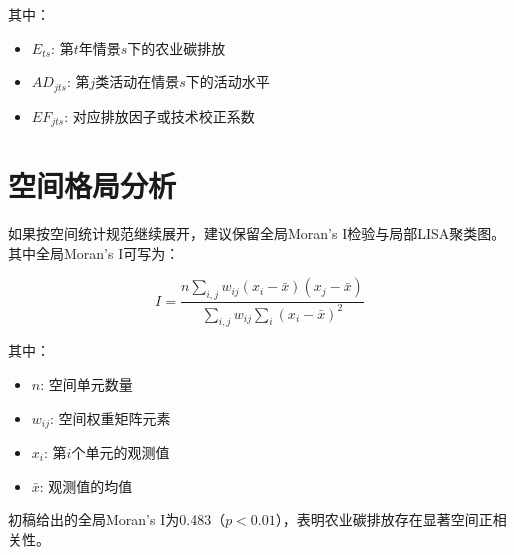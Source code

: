 \documentclass{article}
\begin{document}
其中：
\begin{itemize}
\item $E_{ts}$: 第$t$年情景$s$下的农业碳排放
\item $AD_{jts}$: 第$j$类活动在情景$s$下的活动水平
\item $EF_{jts}$: 对应排放因子或技术校正系数
\end{itemize}

\section{空间格局分析}

如果按空间统计规范继续展开，建议保留全局Moran’s I检验与局部LISA聚类图。其中全局Moran’s I可写为：

\begin{equation}
I = \frac{n \sum_{i,j} w_{ij}(x_i - \bar{x})(x_j - \bar{x})}{\sum_{i,j} w_{ij} \sum_i (x_i - \bar{x})^2}
\end{equation}

其中：
\begin{itemize}
\item $n$: 空间单元数量
\item $w_{ij}$: 空间权重矩阵元素
\item $x_i$: 第$i$个单元的观测值
\item $\bar{x}$: 观测值的均值
\end{itemize}

初稿给出的全局Moran’s I为0.483（$p<0.01$），表明农业碳排放存在显著空间正相关性。
\end{document}
